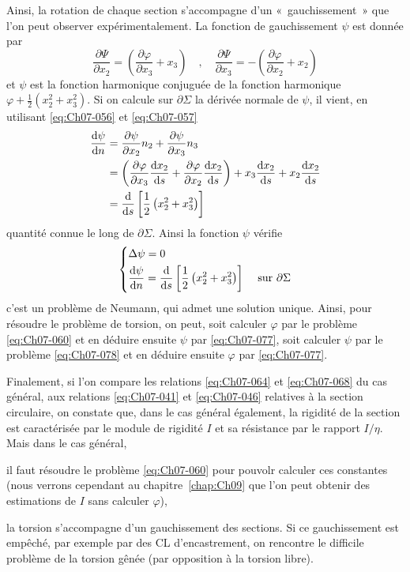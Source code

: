 Ainsi, la rotation de chaque section s'accompagne d'un «~gauchissement~» que l'on peut observer expérimentalement.
La fonction de gauchissement $\psi$ est donnée par 
\begin{equation}
    \frac{\partial \Psi}{\partial x_2} = \left( \frac{\partial \varphi}{\partial x_3} + x_3 \right) \quad , \quad \frac{\partial \Psi}{\partial x_3} = -\left( \frac{\partial \varphi}{\partial x_2} + x_2 \right)
    \label{eq:Ch07-077}
\end{equation}
et $\psi$ est la fonction harmonique conjuguée de la fonction harmonique $\varphi + \frac{1}{2} (x_2^2 + x_3^2)$.
Si 	on calcule sur $\partial \Sigma$ la dérivée normale de $\psi$, il vient, en utilisant \eqref{eq:Ch07-056} et \eqref{eq:Ch07-057} 
\begin{align*}
    \frac{\mathrm{d} \psi}{\mathrm{d} n} &= \frac{\partial \psi}{\partial x_2} n_2 + \frac{\partial \psi}{\partial x_3} n_3 \\
    &= \left( \frac{\partial \varphi}{\partial x_3} \frac{\mathrm{d} x_2}{\mathrm{d} s} + \frac{\partial \varphi}{\partial x_2} \frac{\mathrm{d} x_2}{\mathrm{d} s} \right) + x_3 \frac{\mathrm{d} x_2}{\mathrm{d} s} + x_2 \frac{\mathrm{d} x_2}{\mathrm{d} s} \\
    &= \frac{\mathrm{d}}{\mathrm{d} s} \left[ \frac{1}{2} \left( x_2^2 + x_3^2 \right) \right]
\end{align*}
quantité connue le long de $\partial \Sigma$.
Ainsi la fonction $\psi$ vérifie
\begin{equation}
    \left\{
    \begin{aligned}
        &\Delta \psi = 0 \\
        &\frac{\mathrm{d} \psi}{\mathrm{d} n} = \frac{\mathrm{d}}{\mathrm{d} s} \left[ \frac{1}{2} \left( x_2^2 + x_3^2 \right) \right] & \text{ sur } \partial \Sigma
    \end{aligned}
    \right.
    \label{eq:Ch07-078}
\end{equation}
c'est un problème de Neumann, qui admet une solution unique.
Ainsi, pour résoudre le problème de torsion, on peut, soit calculer $\varphi$ par le problème \eqref{eq:Ch07-060} et en déduire ensuite $\psi$ par \eqref{eq:Ch07-077}, soit calculer $\psi$ par le problème \eqref{eq:Ch07-078} et en déduire ensuite $\varphi$ par \eqref{eq:Ch07-077}. 

Finalement, si l'on compare les relations \eqref{eq:Ch07-064} et \eqref{eq:Ch07-068} du cas général, aux relations \eqref{eq:Ch07-041} et \eqref{eq:Ch07-046} relatives à la section circulaire, on constate que, dans le cas général également, la rigidité de la section est caractérisée par le module de rigidité $I$ et sa résistance par le rapport $I/\eta$.
Mais dans le cas général, 
\begin{inparaenum}[a)]
    \item il faut résoudre le problème \eqref{eq:Ch07-060} pour pouvolr calculer ces constantes (nous verrons cependant au chapitre~\ref{chap:Ch09} que l'on peut obtenir des estimations de $I$ sans calculer $\varphi$),
    \item la torsion s'accompagne d'un gauchissement des sections.
        Si ce gauchissement est empêché, par exemple par des CL d'encastrement, on rencontre le difficile problème de la torsion gênée (par opposition à la torsion libre).
\end{inparaenum}

